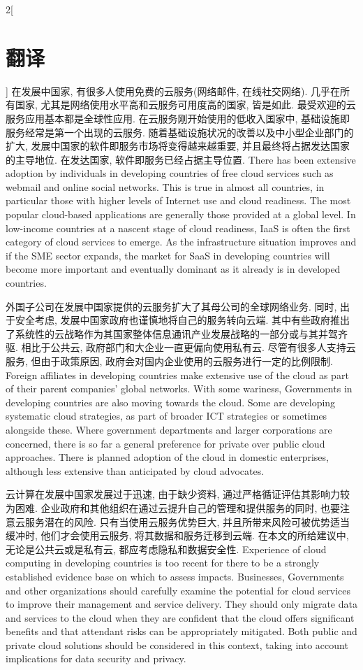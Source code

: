\documentclass[a4paper, UTF8, 12pt]{article}
\begin{document}
\begin{paracol}{2}[\section{翻译}]
    \switchcolumn*
    在发展中国家, 有很多人使用免费的云服务(网络邮件, 在线社交网络). 几乎在所有国家, 尤其是网络使用水平高和云服务可用度高的国家, 皆是如此. 最受欢迎的云服务应用基本都是全球性应用. 在云服务刚开始使用的低收入国家中, 基础设施即服务经常是第一个出现的云服务. 随着基础设施状况的改善以及中小型企业部门的扩大, 发展中国家的软件即服务市场将变得越来越重要, 并且最终将占据发达国家的主导地位. 在发达国家, 软件即服务已经占据主导位置.
    \switchcolumn
    There has been extensive adoption by individuals in developing countries of free cloud services such as webmail and online social networks. This is true in almost all countries, in particular those with higher levels of Internet use and cloud readiness. The most popular cloud-based applications are generally those provided at a global level. In low-income countries at a nascent stage of cloud readiness, IaaS is often the first category of cloud services to emerge. As the infrastructure situation improves and if the SME sector expands, the market for SaaS in developing countries will become more important and eventually dominant as it already is in developed countries.

    \switchcolumn*
    外国子公司在发展中国家提供的云服务扩大了其母公司的全球网络业务. 同时, 出于安全考虑, 发展中国家政府也谨慎地将自己的服务转向云端. 其中有些政府推出了系统性的云战略作为其国家整体信息通讯产业发展战略的一部分或与其并驾齐驱. 相比于公共云, 政府部门和大企业一直更偏向使用私有云. 尽管有很多人支持云服务, 但由于政策原因, 政府会对国内企业使用的云服务进行一定的比例限制.
    \switchcolumn
    \hypertarget{par:01}{}
    Foreign affiliates in developing countries make extensive use of the cloud as part of their parent companies’ global networks. With some wariness, Governments in developing countries are also moving towards the cloud. Some are developing systematic cloud strategies, as part of broader ICT strategies or sometimes alongside these. Where government departments and larger corporations are concerned, there is so far a general preference for private over public cloud approaches. There is planned adoption of the cloud in domestic enterprises, although less extensive than anticipated by cloud advocates. 
    
    \switchcolumn*
    云计算在发展中国家发展过于迅速, 由于缺少资料, 通过严格循证评估其影响力较为困难. 企业政府和其他组织在通过云提升自己的管理和提供服务的同时, 也要注意云服务潜在的风险. 只有当使用云服务优势巨大, 并且所带来风险可被优势适当缓冲时, 他们才会使用云服务, 将其数据和服务迁移到云端. 在本文的所给建议中, 无论是公共云或是私有云, 都应考虑隐私和数据安全性.
    \switchcolumn
    \hypertarget{par:02}{}
    Experience of cloud computing in developing countries is too recent for there to be a strongly established evidence base on which to assess impacts. Businesses, Governments and other organizations should carefully examine the potential for cloud services to improve their management and service delivery. They should only migrate data and services to the cloud when they are confident that the cloud offers significant benefits and that attendant risks can be appropriately mitigated. Both public and private cloud solutions should be considered in this context, taking into account implications for data security and privacy. 



\end{paracol}
\end{document}
